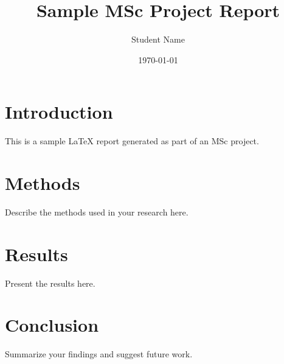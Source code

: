 \documentclass{article}
\title{Sample MSc Project Report}
\author{Student Name}
\date{\today}
\begin{document}
\maketitle

\section{Introduction}
This is a sample LaTeX report generated as part of an MSc project.

\section{Methods}
Describe the methods used in your research here.

\section{Results}
Present the results here.

\section{Conclusion}
Summarize your findings and suggest future work.
\end{document}
